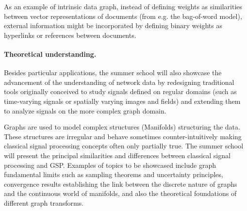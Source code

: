 \documentclass[a4paper]{scrartcl}
\begin{document}
As an example of intrinsic data graph, instead of defining weights as
similarities between vector representations of documents (from e.g. the
bag-of-word model), external information might be incorporated by defining
binary weights as hyperlinks or references between documents.

\paragraph{Theoretical understanding.}
Besides particular applications, the summer school will also showcase the
advancement of the understanding of network data by redesigning traditional
tools originally conceived to study signals defined on regular domains (such as
time-varying signals or spatially varying images and fields) and extending them
to analyze signals on the more complex graph domain. 

Graphs are used to model complex structures (Manifolds) structuring the data.
These structures are irregular and behave sometimes counter-intuitively making
classical signal processing concepts often only partially true. The summer
school will present the principal similarities and differences between
classical signal processing and GSP.  Examples of topics
to be showcased include graph fundamental limits such as
sampling theorems and uncertainty principles, convergence results
establishing the link between the discrete nature of graphs and the continuous
world of manifolds, and also the theoretical foundations of different graph
transforms.  %
\end{document}
